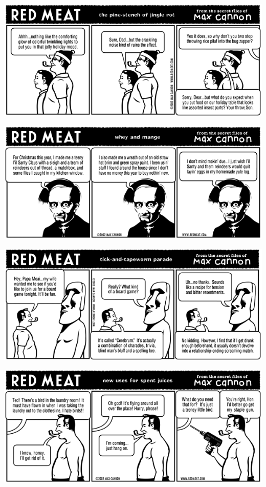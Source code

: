 \documentclass[a4paper,twoside,11pt]{article}
\begin{document}
\includegraphics[width=\textwidth]{redmeat_2002-12-24.png}



\includegraphics[width=\textwidth]{redmeat_2002-12-31.png}



\includegraphics[width=\textwidth]{redmeat_2003-01-07.png}



\includegraphics[width=\textwidth]{redmeat_2003-01-14.png}
\end{document}
